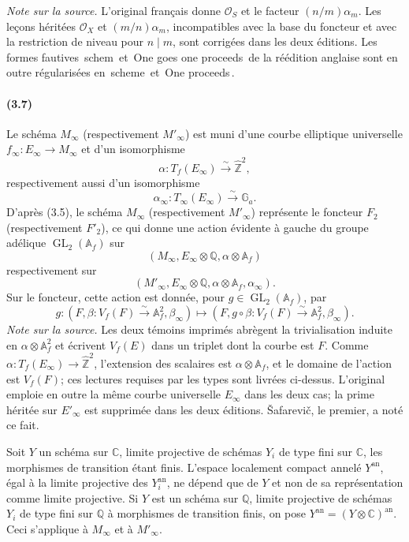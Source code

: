 \documentclass[10pt]{article}
\newcommand{\Af}{\mathbb A_f}
\newcommand{\C}{\mathbb C}
\newcommand{\Q}{\mathbb Q}
\newcommand{\bZ}{\widehat{\mathbb Z}}
\newcommand{\Ga}{\mathbb G_a}
\newcommand{\GL}{\operatorname{GL}}
\newcommand{\cO}{\mathcal O}
\newcommand{\an}{\mathrm{an}}
\newcommand{\frquote}[1]{\guillemotleft{}\,#1\,\guillemotright{}}
\begin{document}
\noindent\emph{Note sur la source.} L'original français donne $\cO_S$ et le facteur
$(n/m)\alpha_m$. Les leçons héritées $\cO_X$ et $(m/n)\alpha_m$, incompatibles avec la base
du foncteur et avec la restriction de niveau pour $n\mid m$, sont corrigées dans les deux
éditions. Les formes fautives \frquote{schem} et \frquote{One goes one proceeds} de la
réédition anglaise sont en outre régularisées en \frquote{scheme} et \frquote{One proceeds}.

\paragraph{(3.7)}
Le schéma $M_\infty$ (respectivement $M'_\infty$) est muni d'une courbe elliptique
universelle $f_\infty:E_\infty\to M_\infty$ et d'un isomorphisme
\[
\alpha:T_f(E_\infty)\xrightarrow{\sim}\bZ^2,
\]
respectivement aussi d'un isomorphisme
\[
\alpha_\infty:T_\infty(E_\infty)\xrightarrow{\sim}\Ga.
\]
D'après (3.5), le schéma $M_\infty$ (respectivement $M'_\infty$) représente le foncteur
$F_2$ (respectivement $F'_2$), ce qui donne une action évidente à gauche du groupe
adélique $\GL_2(\Af)$ sur
\[
(M_\infty,E_\infty\otimes\Q,\alpha\otimes\Af)
\]
respectivement sur
\[
(M'_\infty,E_\infty\otimes\Q,\alpha\otimes\Af,\alpha_\infty).
\]
Sur le foncteur, cette action est donnée, pour $g\in\GL_2(\Af)$, par
\[
g:(F,\beta:V_f(F)\xrightarrow{\sim}\Af^2,\beta_\infty)
\longmapsto
(F,g\circ\beta:V_f(F)\xrightarrow{\sim}\Af^2,\beta_\infty).
\]
\noindent\emph{Note sur la source.} Les deux témoins imprimés abrègent la trivialisation
induite en $\alpha\otimes\Af^2$ et écrivent $V_f(E)$ dans un triplet dont la courbe est $F$.
Comme $\alpha:T_f(E_\infty)\to\bZ^2$, l'extension des scalaires est $\alpha\otimes\Af$,
et le domaine de l'action est $V_f(F)$; ces lectures requises par les types sont livrées ci-dessus.
L'original emploie en outre la même courbe universelle $E_\infty$ dans les deux cas; la prime
héritée sur $E'_\infty$ est supprimée dans les deux éditions.
\v{S}afarevi\v{c}, le premier, a noté ce fait.

Soit $Y$ un schéma sur $\C$, limite projective de schémas $Y_i$ de type fini sur $\C$,
les morphismes de transition étant finis. L'espace localement compact annelé $Y^{\an}$,
égal à la limite projective des $Y_i^{\an}$, ne dépend que de $Y$ et non de sa représentation
comme limite projective. Si $Y$ est un schéma sur $\Q$, limite projective de schémas $Y_i$
de type fini sur $\Q$ à morphismes de transition finis, on pose $Y^{\an}=(Y\otimes\C)^{\an}$.
Ceci s'applique à $M_\infty$ et à $M'_\infty$.
\end{document}
